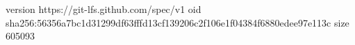 version https://git-lfs.github.com/spec/v1
oid sha256:56356a7bc1d31299df63fffd13cf139206c2f106e1f04384f6880edee97e113c
size 605093

